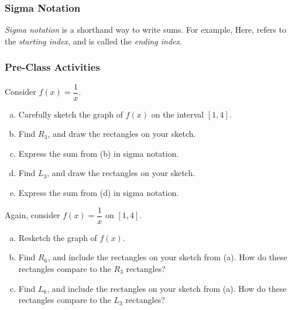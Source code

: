 \documentclass[notes]{subfiles}
\begin{document}
	\subsubsection*{Sigma Notation}
		\begin{rmk}
			\emph{Sigma notation} is a shorthand way to write sums.  For example,
			Here,  refers to the \emph{starting index}, and   is called the \emph{ending index}.  
		\end{rmk}	
		\newpage
		
		
	\subsubsection*{Pre-Class Activities}
		\begin{ex}
			Consider $f(x) = \dfrac{1}{x}$.
			\begin{enumerate}[(a)]
				\item Carefully sketch the graph of $f(x)$ on the interval $[1,4]$.
					
				\item Find $R_3$, and draw the rectangles on your sketch.

				\item Express the sum from (b) in sigma notation.
					
				\item Find $L_3$, and draw the rectangles on your sketch.
					
				\item Express the sum from (d) in sigma notation.
					
			\end{enumerate}
		\end{ex}
			\newpage
			
		\begin{ex}
			Again, consider $f(x) = \dfrac{1}{x}$ on $[1,4]$.
			\begin{enumerate}[(a)]
				\item Resketch the graph of $f(x)$.
					\vs{1}
					
				\item Find $R_6$, and include the rectangles on your sketch from (a).  How do these rectangles compare to the $R_3$ rectangles?
					\vs{1}
					
				\item Find $L_6$, and include the rectangles on your sketch from (a).  How do these rectangles compare to the $L_3$ rectangles?
					\vs{1}
 
			\end{enumerate}
		\end{ex}
			\newpage
			
\end{document}
